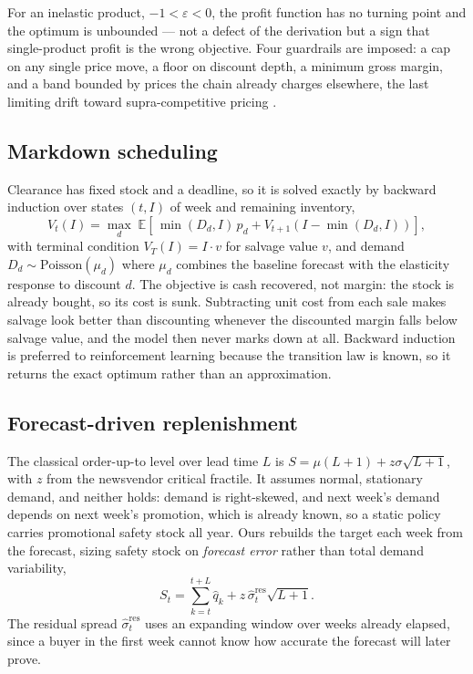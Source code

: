 \documentclass[conference,a4paper]{IEEEtran}
\begin{document}
For an inelastic product, $-1<\varepsilon<0$, the profit function has no turning
point and the optimum is unbounded --- not a defect of the derivation but a sign
that single-product profit is the wrong objective. Four guardrails are imposed: a
cap on any single price move, a floor on discount depth, a minimum gross margin,
and a band bounded by prices the chain already charges elsewhere, the last
limiting drift toward supra-competitive pricing \cite{assad2024,fish2024}.

\subsection{Markdown scheduling}
Clearance has fixed stock and a deadline, so it is solved exactly by backward
induction over states $(t,I)$ of week and remaining inventory,
\begin{equation}
V_t(I)=\max_{d}\;
\mathbb{E}\!\left[\,\min(D_d,I)\,p_d + V_{t+1}\!\left(I-\min(D_d,I)\right)\right],
\label{eq:dp}
\end{equation}
with terminal condition $V_T(I)=I\cdot v$ for salvage value $v$, and demand
$D_d\sim\text{Poisson}(\mu_d)$ where $\mu_d$ combines the baseline forecast with
the elasticity response to discount $d$. The objective is cash recovered, not
margin: the stock is already bought, so its cost is sunk. Subtracting unit cost from each sale makes salvage look better than
discounting whenever the discounted margin falls below salvage value, and the
model then never marks down at all. Backward induction is preferred to
reinforcement learning because the transition law is known, so it returns the
exact optimum rather than an approximation.

\subsection{Forecast-driven replenishment}
The classical order-up-to level over lead time $L$ is
$S=\mu(L+1)+z\sigma\sqrt{L+1}$, with $z$ from the newsvendor critical fractile. It
assumes normal, stationary demand, and neither holds: demand is right-skewed, and
next week's demand depends on next week's promotion, which is already known, so a
static policy carries promotional safety stock all year. Ours rebuilds the target
each week from the forecast, sizing safety stock on \emph{forecast error} rather
than total demand variability,
\begin{equation}
S_t=\sum_{k=t}^{t+L}\hat q_k + z\,\hat\sigma^{\text{res}}_t\sqrt{L+1}.
\label{eq:invpolicy}
\end{equation}
The residual spread $\hat\sigma^{\text{res}}_t$ uses an expanding window over
weeks already elapsed, since a buyer in the first week cannot know how accurate
the forecast will later prove.
\end{document}
